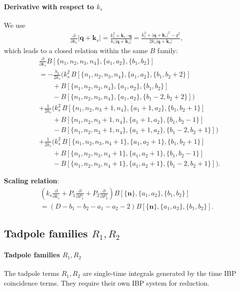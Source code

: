 \documentclass[a4paper,12pt]{article}
\newcommand{\n}{\nonumber}
\begin{document}
\paragraph{Derivative with respect to $k_s$}
We use
\begin{align}
	\frac{\partial}{\partial k_s}|\bm q+\bm k_s|
	=\frac{k_s^2+\bm k_s\cdot \bm q}{k_s|\bm q+\bm k_s|}
	=\frac{k_s^2+|\bm q+\bm k_s|^2-q^2}{2k_s|\bm q+\bm k_s|},
\end{align}
which leads to a closed relation within the same $B$ family:
\begin{align}
	&\frac{\partial}{\partial k_s}B[\{n_1,n_2,n_3,n_4\},\{a_1,a_2\},\{b_1,b_2\}] \n\\
	&=-\frac{b_2}{2k_s}\Big(
	k_s^2\,B[\{n_1,n_2,n_3,n_4\},\{a_1,a_2\},\{b_1,b_2+2\}] \nonumber\\
	&\qquad
	+B[\{n_1,n_2,n_3,n_4\},\{a_1,a_2\},\{b_1,b_2\}] \nonumber\\
	&\qquad
	-B[\{n_1,n_2,n_3,n_4\},\{a_1,a_2\},\{b_1-2,b_2+2\}]
	\Big) \nonumber\\
	&+\frac{1}{2k_s}\Big(
	k_s^2\,B[\{n_1,n_2,n_3+1,n_4\},\{a_1+1,a_2\},\{b_1,b_2+1\}] \nonumber\\
	&\qquad
	+B[\{n_1,n_2,n_3+1,n_4\},\{a_1+1,a_2\},\{b_1,b_2-1\}] \nonumber\\
	&\qquad
	-B[\{n_1,n_2,n_3+1,n_4\},\{a_1+1,a_2\},\{b_1-2,b_2+1\}]
	\Big) \nonumber\\
	&+\frac{1}{2k_s}\Big(
	k_s^2\,B[\{n_1,n_2,n_3,n_4+1\},\{a_1,a_2+1\},\{b_1,b_2+1\}] \nonumber\\
	&\qquad
	+B[\{n_1,n_2,n_3,n_4+1\},\{a_1,a_2+1\},\{b_1,b_2-1\}] \nonumber\\
	&\qquad
	-B[\{n_1,n_2,n_3,n_4+1\},\{a_1,a_2+1\},\{b_1-2,b_2+1\}]
	\Big). \label{eq:Gdks}
\end{align}

\textbf{Scaling relation}:
\begin{align}
	\left( k_s \frac{\partial}{\partial k_s} + P_1 \frac{\partial}{\partial P_1} + P_2 \frac{\partial}{\partial P_2} \right) B[\{\bm n\},\{a_1,a_2\},\{b_1,b_2\}] \n\\
	= (D - b_1 - b_2 - a_1 - a_2 - 2) B[\{\bm n\},\{a_1,a_2\},\{b_1,b_2\}]. \label{eq:Gscaling}
\end{align}

\subsection{Tadpole families \texorpdfstring{$R_1,R_2$}{R1, R2}}
\paragraph{Tadpole families $R_1,R_2$}
The tadpole terms $R_1,R_2$ are single-time integrals generated by the time IBP coincidence terms. They require their own IBP system for reduction.
\end{document}
